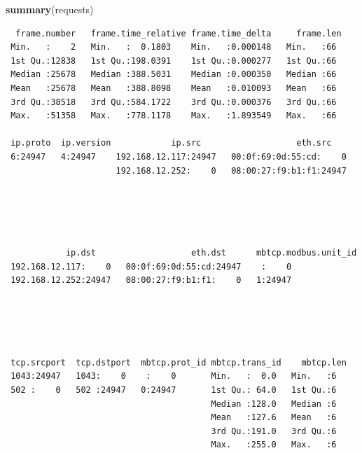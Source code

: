 \documentclass[12pt,]{article}
\newenvironment{Shaded}{\begin{snugshade}}{\end{snugshade}}
\newcommand{\KeywordTok}[1]{\textcolor[rgb]{0.13,0.29,0.53}{\textbf{{#1}}}}
\newcommand{\NormalTok}[1]{{#1}}
\begin{document}
\begin{Shaded}
\begin{Highlighting}[]
\KeywordTok{summary}\NormalTok{(requests)}
\end{Highlighting}
\end{Shaded}

\begin{verbatim}
  frame.number   frame.time_relative frame.time_delta     frame.len 
 Min.   :    2   Min.   :  0.1803    Min.   :0.000148   Min.   :66  
 1st Qu.:12838   1st Qu.:198.0391    1st Qu.:0.000277   1st Qu.:66  
 Median :25678   Median :388.5031    Median :0.000350   Median :66  
 Mean   :25678   Mean   :388.8098    Mean   :0.010093   Mean   :66  
 3rd Qu.:38518   3rd Qu.:584.1722    3rd Qu.:0.000376   3rd Qu.:66  
 Max.   :51358   Max.   :778.1178    Max.   :1.893549   Max.   :66  
                                                                    
 ip.proto  ip.version            ip.src                   eth.src     
 6:24947   4:24947    192.168.12.117:24947   00:0f:69:0d:55:cd:    0  
                      192.168.12.252:    0   08:00:27:f9:b1:f1:24947  
                                                                      
                                                                      
                                                                      
                                                                      
                                                                      
            ip.dst                   eth.dst      mbtcp.modbus.unit_id
 192.168.12.117:    0   00:0f:69:0d:55:cd:24947    :    0             
 192.168.12.252:24947   08:00:27:f9:b1:f1:    0   1:24947             
                                                                      
                                                                      
                                                                      
                                                                      
                                                                      
 tcp.srcport  tcp.dstport  mbtcp.prot_id mbtcp.trans_id    mbtcp.len
 1043:24947   1043:    0    :    0       Min.   :  0.0   Min.   :6  
 502 :    0   502 :24947   0:24947       1st Qu.: 64.0   1st Qu.:6  
                                         Median :128.0   Median :6  
                                         Mean   :127.6   Mean   :6  
                                         3rd Qu.:191.0   3rd Qu.:6  
                                         Max.   :255.0   Max.   :6  
                                                                    

\end{verbatim}
\end{document}
